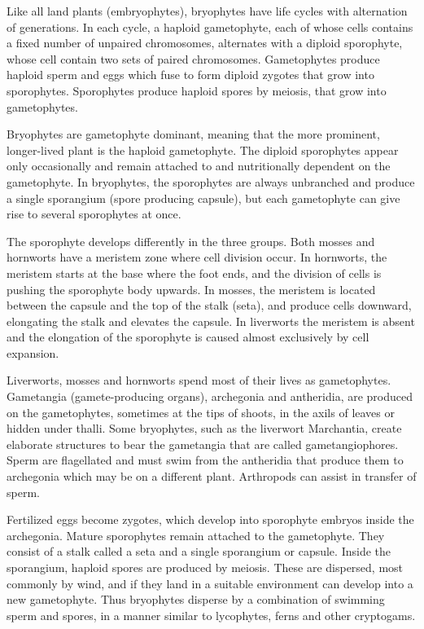 Like all land plants (embryophytes), bryophytes have life cycles with alternation of generations. In each cycle, a haploid gametophyte, each of whose cells contains a fixed number of unpaired chromosomes, alternates with a diploid sporophyte, whose cell contain two sets of paired chromosomes. Gametophytes produce haploid sperm and eggs which fuse to form diploid zygotes that grow into sporophytes. Sporophytes produce haploid spores by meiosis, that grow into gametophytes.

Bryophytes are gametophyte dominant, meaning that the more prominent, longer-lived plant is the haploid gametophyte. The diploid sporophytes appear only occasionally and remain attached to and nutritionally dependent on the gametophyte. In bryophytes, the sporophytes are always unbranched and produce a single sporangium (spore producing capsule), but each gametophyte can give rise to several sporophytes at once.

The sporophyte develops differently in the three groups. Both mosses and hornworts have a meristem zone where cell division occur. In hornworts, the meristem starts at the base where the foot ends, and the division of cells is pushing the sporophyte body upwards. In mosses, the meristem is located between the capsule and the top of the stalk (seta), and produce cells downward, elongating the stalk and elevates the capsule. In liverworts the meristem is absent and the elongation of the sporophyte is caused almost exclusively by cell expansion.

Liverworts, mosses and hornworts spend most of their lives as gametophytes. Gametangia (gamete-producing organs), archegonia and antheridia, are produced on the gametophytes, sometimes at the tips of shoots, in the axils of leaves or hidden under thalli. Some bryophytes, such as the liverwort Marchantia, create elaborate structures to bear the gametangia that are called gametangiophores. Sperm are flagellated and must swim from the antheridia that produce them to archegonia which may be on a different plant. Arthropods can assist in transfer of sperm.

Fertilized eggs become zygotes, which develop into sporophyte embryos inside the archegonia. Mature sporophytes remain attached to the gametophyte. They consist of a stalk called a seta and a single sporangium or capsule. Inside the sporangium, haploid spores are produced by meiosis. These are dispersed, most commonly by wind, and if they land in a suitable environment can develop into a new gametophyte. Thus bryophytes disperse by a combination of swimming sperm and spores, in a manner similar to lycophytes, ferns and other cryptogams.

